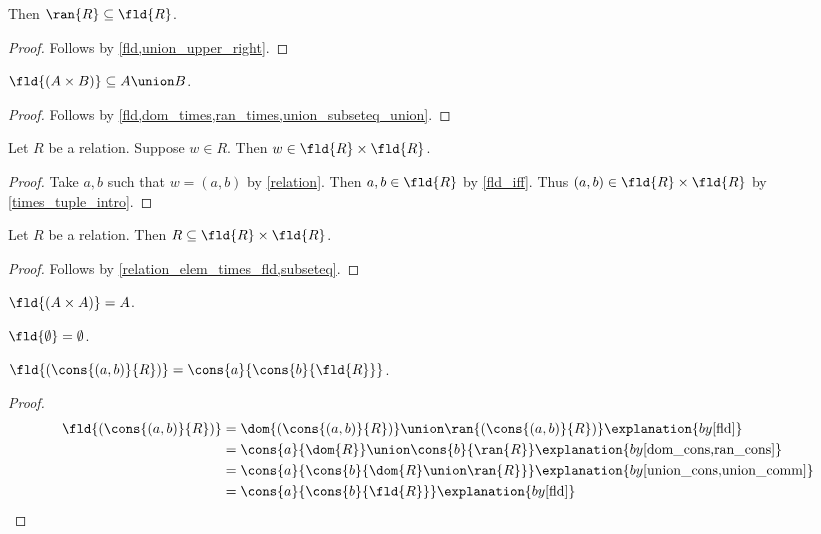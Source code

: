 \begin{proposition}\label{ran_subseteq_fld}
    Then $\ran{R}\subseteq\fld{R}$.
\end{proposition}
\begin{proof}
    Follows by \cref{fld,union_upper_right}.
\end{proof}

\begin{proposition}\label{fld_times}
    $\fld{(A\times B)}\subseteq A\union B$.
\end{proposition}
\begin{proof}
    Follows by \cref{fld,dom_times,ran_times,union_subseteq_union}.
\end{proof}

\begin{proposition}\label{relation_elem_times_fld}
    Let $R$ be a relation.
    Suppose $w\in R$.
    Then $w\in\fld{R}\times\fld{R}$.
\end{proposition}
\begin{proof}
    Take $a,b$ such that $w = (a, b)$ by \cref{relation}.
    Then $a,b\in\fld{R}$ by \cref{fld_iff}.
    Thus $(a,b)\in\fld{R}\times\fld{R}$ by \cref{times_tuple_intro}.
\end{proof}

\begin{proposition}\label{relation_subseteq_times_fld}
    Let $R$ be a relation.
    Then $R\subseteq\fld{R}\times\fld{R}$.
\end{proposition}
\begin{proof}
    Follows by \cref{relation_elem_times_fld,subseteq}.
\end{proof}

\begin{proposition}\label{fld_universal}
    $\fld{(A\times A)} = A$.
\end{proposition}

\begin{proposition}\label{fld_emptyset}
    $\fld{\emptyset} = \emptyset$.
\end{proposition}

\begin{proposition}\label{fld_cons}
    $\fld{(\cons{(a,b)}{R})} = \cons{a}{\cons{b}{\fld{R}}}$.
\end{proposition}
\begin{proof}
    \begin{align*}
        \fld{(\cons{(a,b)}{R})}
        &= \dom{(\cons{(a,b)}{R})}\union\ran{(\cons{(a,b)}{R})}
            \explanation{by \cref{fld}}\\
        &= \cons{a}{\dom{R}}\union\cons{b}{\ran{R}}
            \explanation{by \cref{dom_cons,ran_cons}}\\
        &= \cons{a}{\cons{b}{\dom{R}\union\ran{R}}}
            \explanation{by \cref{union_cons,union_comm}}\\
        &= \cons{a}{\cons{b}{\fld{R}}}
          \explanation{by \cref{fld}}
    \end{align*}
\end{proof}

